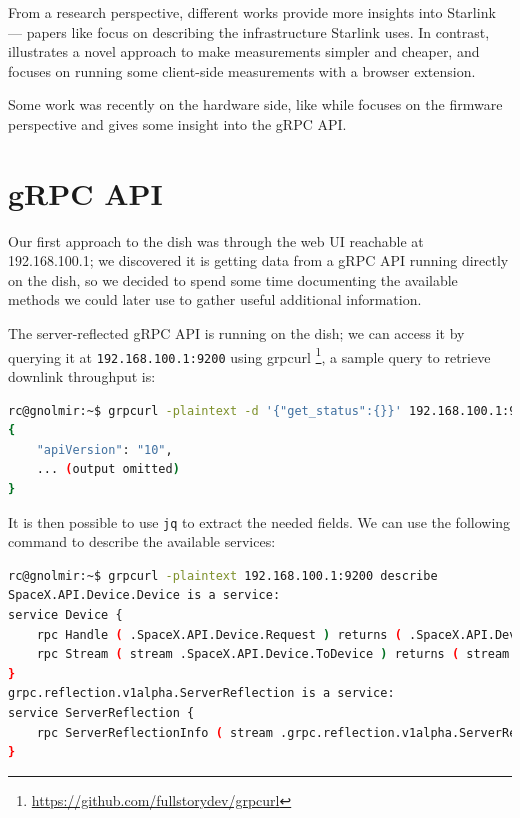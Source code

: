 \documentclass[IN,11pt,twoside,openright,idp,english]{tumthesis}
\begin{document}
From a research perspective, different works provide more insights into Starlink — papers like \cite{pan2023measuring} focus on describing the infrastructure Starlink uses. In contrast, \cite{izhikevich2023democratizing} illustrates a novel approach to make measurements simpler and cheaper, and \cite{browser-side} focuses on running some client-side measurements with a browser extension.
    
Some work was recently on the hardware side, like \cite{glitching} while \cite{quarkslab} focuses on the firmware perspective and gives some insight into the gRPC API.
    
\section{gRPC API}
    
Our first approach to the dish was through the web UI reachable at 192.168.100.1; we discovered it is getting data from a gRPC API running directly on the dish, so we decided to spend some time documenting the available methods we could later use to gather useful additional information.
    
The server-reflected gRPC API is running on the dish; we can access it by querying it at \texttt{192.168.100.1:9200} using grpcurl \footnote{\url{https://github.com/fullstorydev/grpcurl}}, a sample query to retrieve downlink throughput is:
    
\begin{lstlisting}[language=bash]
rc@gnolmir:~$ grpcurl -plaintext -d '{"get_status":{}}' 192.168.100.1:9200 SpaceX.API.Device.Device/Handle
{
    "apiVersion": "10",
    ... (output omitted)
}
\end{lstlisting}
    
It is then possible to use \texttt{jq} to extract the needed fields. We can use the following command to describe the available services:
    
\begin{lstlisting}[language=bash]
rc@gnolmir:~$ grpcurl -plaintext 192.168.100.1:9200 describe
SpaceX.API.Device.Device is a service:
service Device {
    rpc Handle ( .SpaceX.API.Device.Request ) returns ( .SpaceX.API.Device.Response );
    rpc Stream ( stream .SpaceX.API.Device.ToDevice ) returns ( stream .SpaceX.API.Device.FromDevice );
}
grpc.reflection.v1alpha.ServerReflection is a service:
service ServerReflection {
    rpc ServerReflectionInfo ( stream .grpc.reflection.v1alpha.ServerReflectionRequest ) returns ( stream .grpc.reflection.v1alpha.ServerReflectionResponse );
}
\end{lstlisting}
    
\end{document}
